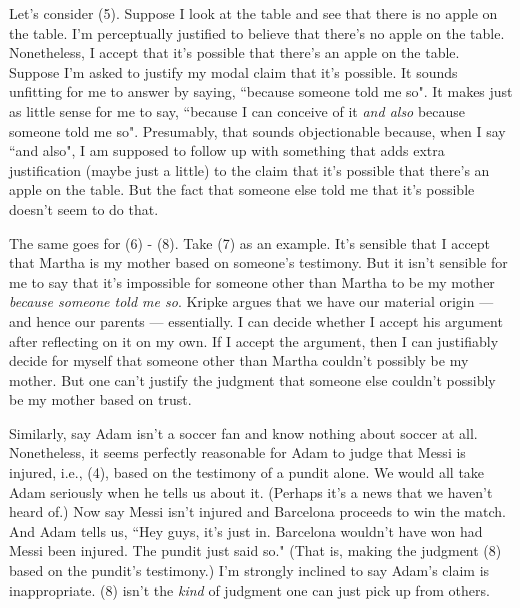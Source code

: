 \documentclass[a4paper,12pt]{article}
\begin{document}
Let's consider (5). Suppose I look at the table and see that there is no apple on the table. I'm perceptually justified to believe that there's no apple on the table. Nonetheless, I accept that it's possible that there's an apple on the table. Suppose I'm asked to justify my modal claim that it's possible. It sounds unfitting for me to answer by saying, ``because someone told me so". It makes just as little sense for me to say, ``because I can conceive of it \emph{and also} because someone told me so". Presumably, that sounds objectionable because, when I say ``and also", I am supposed to follow up with something that adds extra justification (maybe just a little) to the claim that it's possible that there's an apple on the table. But the fact that someone else told me that it's possible doesn't seem to do that.

The same goes for (6) - (8). Take (7) as an example. It's sensible that I accept that Martha is my mother based on someone's testimony. But it isn't sensible for me to say that it's impossible for someone other than Martha to be my mother \emph{because someone told me so}. Kripke argues that we have our material origin --- and hence our parents --- essentially. I can decide whether I accept his argument after reflecting on it on my own. If I accept the argument, then I can justifiably decide for myself that someone other than Martha couldn't possibly be my mother. But one can't justify the judgment that someone else couldn't possibly be my mother based on trust.\footnotemark


Similarly, say Adam isn't a soccer fan and know nothing about soccer at all. Nonetheless, it seems perfectly reasonable for Adam to judge that Messi is injured, i.e., (4), based on the testimony of a pundit alone. We would all take Adam seriously when he tells us about it. (Perhaps it's a news that we haven't heard of.) Now say Messi isn't injured and Barcelona proceeds to win the match. And Adam tells us, ``Hey guys, it's just in. Barcelona wouldn't have won had Messi been injured. The pundit just said so." (That is, making the judgment (8) based on the pundit's testimony.) I'm strongly inclined to say Adam's claim is inappropriate. (8) isn't the \emph{kind} of judgment one can just pick up from others.
\end{document}

